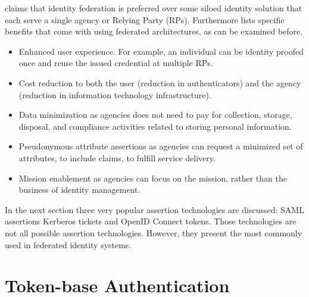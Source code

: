 {	
	\cite{NIST:2017:DIG} claims that identity federation is preferred over some siloed identity solution that each serve a single agency or Relying Party (RPs). Furthermore \cite{NIST:2017:DIG} lists specific benefits that come with using federated architectures, as can be examined before. 
	
	\begin{itemize}
		\item Enhanced user experience. For example, an individual can be identity proofed once and reuse the issued credential at multiple RPs. 
		\item Cost reduction to both the user (reduction in authenticators) and the agency (reduction in information technology infrastructure). 
		\item Data minimization as agencies does not need to pay for collection, storage, disposal, and compliance activities related to storing personal information. 
		\item Pseudonymous attribute assertions as agencies can request a minimized set of attributes, to include claims, to fulfill service delivery. 
		\item Mission enablement as agencies can focus on the mission, rather than the business of identity management.
	\end{itemize}
	
	In the next section three very popular assertion technologies are discussed: SAML assertions Kerberos tickets and OpenID Connect tokens. Those technologies are not all possible assertion technologies. However, they present the most commonly used in federated identity systems. 


 


\section{Token-base Authentication}


}
